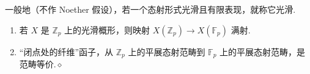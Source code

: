 一般地（不作 Noether 假设），若一个态射形式光滑且有限表现，就称它光滑.
\begin{example}\label{item:ag-3-4-17}
\begin{enumerate}[label=(\roman*)]
\item 若 $X$ 是 $\mathbb Z_p$ 上的光滑概形，则映射 $X(\mathbb Z_p)\longrightarrow X(\mathbb F_p)$ 满射.
\item ``闭点处的纤维''函子，从 $\mathbb Z_p$ 上的平展态射范畴到 $\mathbb F_p$ 上的平展态射范畴，是范畴等价.\unskip\nobreak\hfill\ensuremath{\diamond}
\end{enumerate}
\renewcommand{\envenddiamond}{}
\end{example}